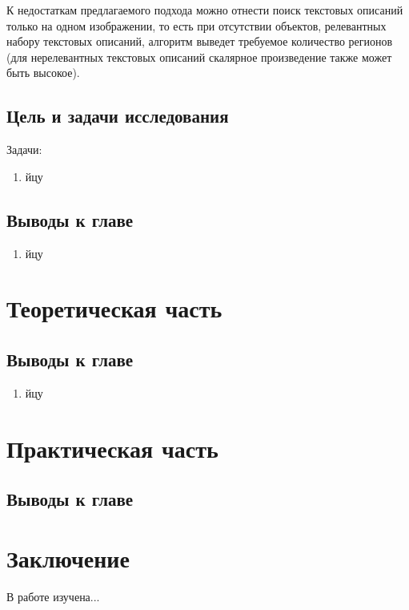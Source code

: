 \documentclass[a4paper,14pt]{article}
\begin{document}
	К недостаткам предлагаемого подхода можно отнести поиск текстовых описаний только на одном изображении, то есть при отсутствии объектов, релевантных набору текстовых описаний, алгоритм  выведет требуемое количество регионов (для нерелевантных текстовых описаний скалярное произведение также может быть высокое).
	
    \subsection{Цель и задачи исследования}

    Задачи:
    \begin{enumerate}
        [1)]
        \itemsep0em
        \item йцу

    \end{enumerate}

    \subsection{Выводы к главе \thesection}
    \begin{enumerate}
        [1)]
        \itemsep0em
        \item йцу
    \end{enumerate}

    \newpage


    \section{Теоретическая часть}

    \subsection{Выводы к главе \thesection}
    \begin{enumerate}
        [1)]
        \itemsep0em
        \item йцу
    \end{enumerate}

    \newpage


    \section{Практическая часть}

    \subsection{Выводы к главе \thesection}



    \newpage


    \section{Заключение}

    В работе изучена...

    \newpage
    \renewcommand{\refname}{{\normalsize \hfill Список использованных источников \hfill}}
%    
    
    
    \newpage
\end{document}
